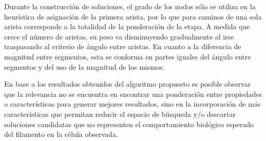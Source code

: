 Durante la construcci\'on de soluciones, el grado de los nodos s\'olo se utiliza en la heur\'istica de asignaci\'on de la primera arista, por lo que para caminos de una sola arista corresponde a la totalidad de la ponderaci\'on de la etapa. A medida que crece el n\'umero de aristas, su peso va disminuyendo gradualmente al irse traspasando al criterio de \'angulo entre aristas. En cuanto a la diferencia de magnitud entre segmentos, esta se conforma en partes iguales del \'angulo entre segmentos y del uso de la magnitud de los mismos.


En base a los resultados obtenidos del algoritmo propuesto es posible observar que la relevancia no se encuentra en encontrar una ponderaci\'on entre propiedades o caracter\'isticas para generar mejores resultados, sino en la incorporaci\'on de m\'as caracter\'isticas que permitan reducir el espacio de b\'usqueda y/o descartar soluciones candidatas que no representen el comportamiento biol\'ogico esperado del filamento en la c\'elula observada.


